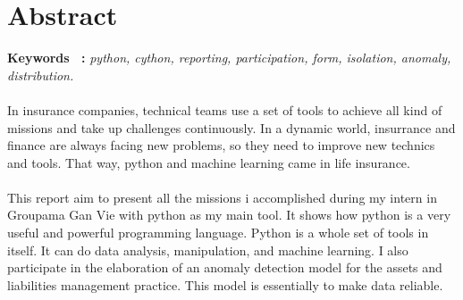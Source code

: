 \chapter*{Abstract}


\textbf {Keywords ~:} \emph{python, cython, reporting, participation, form, isolation, anomaly, distribution.} 
\\
\\
In insurance companies, technical teams use a set of tools to achieve all kind of missions and take up challenges continuously. In a dynamic world, insurrance and finance are always facing new problems, so they need to improve new technics and tools. That way, python and machine learning came in life insurance. 
\\
\\
This report aim to present all the missions i accomplished during my intern in Groupama Gan Vie with python as my main tool. It shows how python is a very useful and powerful programming language. Python is a whole set of tools in itself. It can do data analysis, manipulation, and machine learning. I also participate in the elaboration of an anomaly detection model for the assets and liabilities management practice. This model is essentially to make data reliable.

